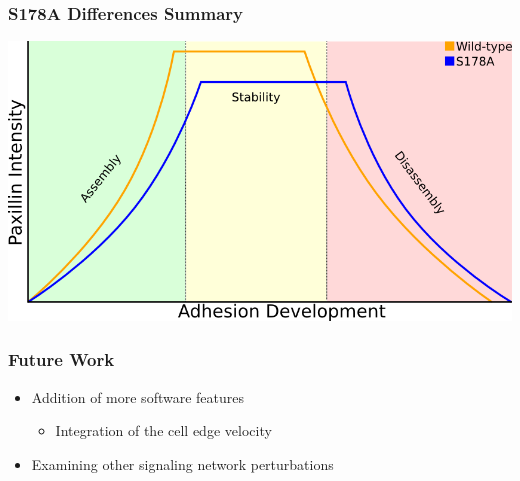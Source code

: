 \documentclass{beamer}
\begin{document}
\begin{frame}
	\frametitle{S178A Differences Summary}
	\includegraphics[width=\textwidth]{figures/S178A/sample_timecourse}
\end{frame}

\begin{frame}
	\frametitle{Future Work}
	\begin{itemize}
	\item Addition of more software features
		\begin{itemize}
		\item Integration of the cell edge velocity
		\end{itemize}
	\item Examining other signaling network perturbations
	\end{itemize}
\end{frame}
\end{document}
